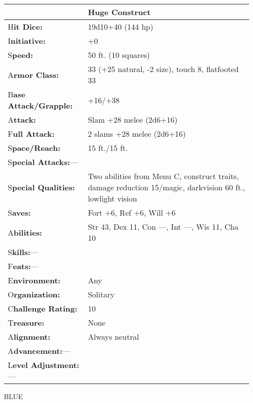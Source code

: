 \documentclass{article}
\begin{document}
\begin{tabular}{|>{\raggedright}p{83pt}|>{\raggedright}p{243pt}|}
\hline
  & Huge Construct\tabularnewline
\hline
H\textbf{it Dice:} & 19d10+40 (144 hp)\tabularnewline
\hline
I\textbf{nitiative:} & +0\tabularnewline
\hline
S\textbf{peed:} & 50 ft. (10 squares)\tabularnewline
\hline
A\textbf{rmor Class:} & 33 (+25 natural, -2 size), touch 8, flatfooted 33\tabularnewline
\hline
B\textbf{ase Attack/Grapple:} & +16/+38\tabularnewline
\hline
A\textbf{ttack:} & Slam +28 melee (2d6+16)\tabularnewline
\hline
F\textbf{ull Attack:} & 2 slams +28 melee (2d6+16)\tabularnewline
\hline
S\textbf{pace/Reach:} & 15 ft./15 ft.\tabularnewline
\hline
S\textbf{pecial Attacks:}--- & \tabularnewline
\hline
S\textbf{pecial Qualities:} & Two abilities from Menu C, construct traits, damage 
reduction 15/magic, darkvision 60 ft., lowlight vision\tabularnewline
\hline
S\textbf{aves:} & Fort +6, Ref +6, Will +6\tabularnewline
\hline
A\textbf{bilities:} & Str 43, Dex 11, Con ---, Int ---, Wis 11, Cha 10\tabularnewline
\hline
S\textbf{kills:}--- & \tabularnewline
\hline
F\textbf{eats:}--- & \tabularnewline
\hline
E\textbf{nvironment:} & Any\tabularnewline
\hline
O\textbf{rganization:} & Solitary\tabularnewline
\hline
C\textbf{hallenge Rating:} & 10\tabularnewline
\hline
T\textbf{reasure:} & None\tabularnewline
\hline
A\textbf{lignment:} & Always neutral\tabularnewline
\hline
A\textbf{dvancement:}--- & \tabularnewline
\hline
L\textbf{evel Adjustment:}--- & \tabularnewline
\hline
\end{tabular}

\vspace{12pt}
{\LARGE{}BLUE}
\end{document}
